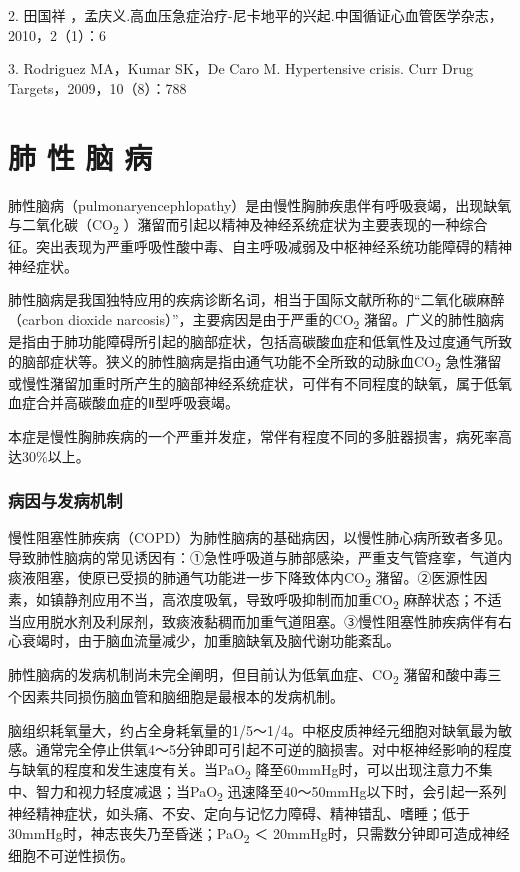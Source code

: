 2. 田国祥
，孟庆义.高血压急症治疗-尼卡地平的兴起.中国循证心血管医学杂志，2010，2（1）：6

3. Rodriguez MA，Kumar SK，De Caro M. Hypertensive crisis. Curr Drug
Targets，2009，10（8）：788

\protect\hypertarget{text00099.html}{}{}

\chapter{肺 性 脑 病}

肺性脑病（pulmonaryencephlopathy）是由慢性胸肺疾患伴有呼吸衰竭，出现缺氧与二氧化碳（CO\textsubscript{2}
）潴留而引起以精神及神经系统症状为主要表现的一种综合征。突出表现为严重呼吸性酸中毒、自主呼吸减弱及中枢神经系统功能障碍的精神神经症状。

肺性脑病是我国独特应用的疾病诊断名词，相当于国际文献所称的“二氧化碳麻醉（carbon
dioxide narcosis）”，主要病因是由于严重的CO\textsubscript{2}
潴留。广义的肺性脑病是指由于肺功能障碍所引起的脑部症状，包括高碳酸血症和低氧性及过度通气所致的脑部症状等。狭义的肺性脑病是指由通气功能不全所致的动脉血CO\textsubscript{2}
急性潴留或慢性潴留加重时所产生的脑部神经系统症状，可伴有不同程度的缺氧，属于低氧血症合并高碳酸血症的Ⅱ型呼吸衰竭。

本症是慢性胸肺疾病的一个严重并发症，常伴有程度不同的多脏器损害，病死率高达30\%以上。

\subsection{病因与发病机制}

慢性阻塞性肺疾病（COPD）为肺性脑病的基础病因，以慢性肺心病所致者多见。导致肺性脑病的常见诱因有：①急性呼吸道与肺部感染，严重支气管痉挛，气道内痰液阻塞，使原已受损的肺通气功能进一步下降致体内CO\textsubscript{2}
潴留。②医源性因素，如镇静剂应用不当，高浓度吸氧，导致呼吸抑制而加重CO\textsubscript{2}
麻醉状态；不适当应用脱水剂及利尿剂，致痰液黏稠而加重气道阻塞。③慢性阻塞性肺疾病伴有右心衰竭时，由于脑血流量减少，加重脑缺氧及脑代谢功能紊乱。

肺性脑病的发病机制尚未完全阐明，但目前认为低氧血症、CO\textsubscript{2}
潴留和酸中毒三个因素共同损伤脑血管和脑细胞是最根本的发病机制。

脑组织耗氧量大，约占全身耗氧量的1/5～1/4。中枢皮质神经元细胞对缺氧最为敏感。通常完全停止供氧4～5分钟即可引起不可逆的脑损害。对中枢神经影响的程度与缺氧的程度和发生速度有关。当PaO\textsubscript{2}
降至60mmHg时，可以出现注意力不集中、智力和视力轻度减退；当PaO\textsubscript{2}
迅速降至40～50mmHg以下时，会引起一系列神经精神症状，如头痛、不安、定向与记忆力障碍、精神错乱、嗜睡；低于30mmHg时，神志丧失乃至昏迷；PaO\textsubscript{2}
＜ 20mmHg时，只需数分钟即可造成神经细胞不可逆性损伤。

